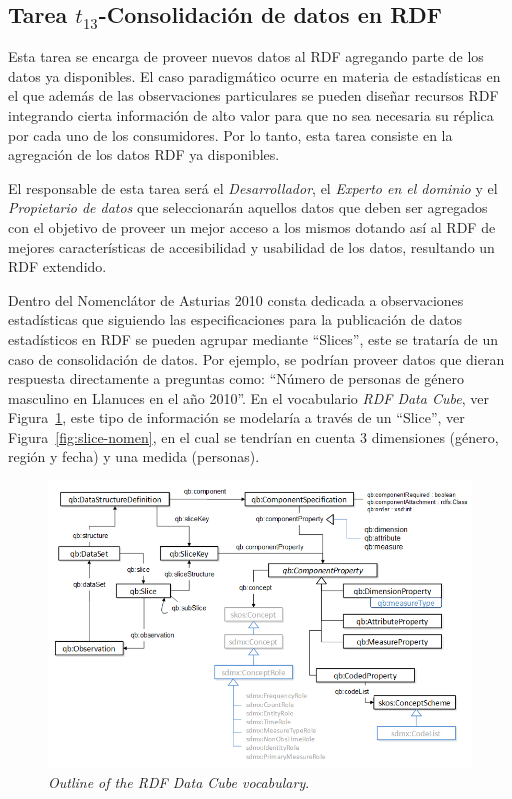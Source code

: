 \subsection{Tarea $t_{13}$-Consolidación de datos en RDF}
Esta tarea se encarga de proveer nuevos datos al \dataset RDF agregando parte de los datos ya disponibles. El caso
paradigmático ocurre en materia de estadísticas en el que además de las observaciones particulares se pueden
diseñar recursos \gls{RDF} integrando cierta información de alto valor para que no sea necesaria su réplica por 
cada uno de los consumidores. Por lo tanto, esta tarea consiste en la agregación de los datos RDF ya disponibles.

El responsable de esta tarea será el \textit{Desarrollador}, el \textit{Experto en el dominio} y el \textit{Propietario de datos} que seleccionarán
aquellos datos que deben ser agregados con el objetivo de proveer un mejor acceso a los mismos dotando así al \dataset
RDF de mejores características de accesibilidad y usabilidad de los datos, resultando un \dataset RDF extendido.

Dentro del Nomenclátor de Asturias 2010 consta dedicada a observaciones estadísticas que siguiendo las especificaciones
para la publicación de datos estadísticos en RDF se pueden agrupar mediante ``Slices'', este se trataría de un caso de consolidación
de datos. Por ejemplo, se podrían proveer datos que dieran respuesta directamente a preguntas como: ``Número de personas de género masculino en Llanuces en el año 2010''.
En el vocabulario \textit{RDF Data Cube}, ver Figura~\ref{fig:qb}, este tipo de información se modelaría a través de un ``Slice'', ver Figura~\ref{fig:slice-nomen},
 en el cual se tendrían en cuenta 3 dimensiones (género, región y fecha) y una medida (personas).


\begin{figure}[!htb]
\centering
	\includegraphics[width=14cm]{images/phd/qb-fig}
\caption{\textit{Outline of the RDF Data Cube vocabulary}.}
\label{fig:qb}
\end{figure}



